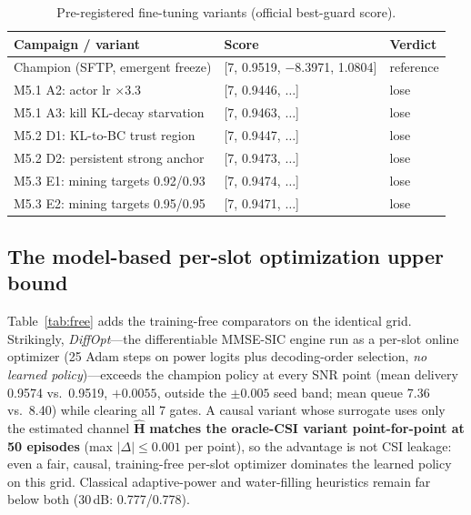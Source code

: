 \documentclass[journal]{IEEEtran}
\newcommand{\vect}[1]{\mathbf{#1}}
\begin{document}
\begin{table}[t]
\centering
\small
\caption{Pre-registered fine-tuning variants (official best-guard score).}
\label{tab:campaign}
\begin{tabular}{l|l|l}
\toprule
Campaign / variant & Score & Verdict \\
\midrule
Champion (SFTP, emergent freeze) & [7, 0.9519, $-$8.3971, 1.0804] & reference \\
M5.1 A2: actor lr $\times$3.3 & [7, 0.9446, $\dots$] & lose \\
M5.1 A3: kill KL-decay starvation & [7, 0.9463, $\dots$] & lose \\
M5.2 D1: KL-to-BC trust region & [7, 0.9447, $\dots$] & lose \\
M5.2 D2: persistent strong anchor & [7, 0.9473, $\dots$] & lose \\
M5.3 E1: mining targets 0.92/0.93 & [7, 0.9474, $\dots$] & lose \\
M5.3 E2: mining targets 0.95/0.95 & [7, 0.9471, $\dots$] & lose \\
\bottomrule
\end{tabular}
\end{table}

\subsection{The model-based per-slot optimization upper bound}
Table~\ref{tab:free} adds the training-free comparators on the identical grid.
Strikingly, \emph{DiffOpt}---the differentiable MMSE-SIC engine run as a per-slot
online optimizer (25 Adam steps on power logits plus decoding-order selection,
\emph{no learned policy})---exceeds the champion policy at every SNR point (mean
delivery 0.9574 vs.\ 0.9519, $+0.0055$, outside the $\pm0.005$ seed band; mean queue
7.36 vs.\ 8.40) while clearing all 7 gates. A causal variant whose surrogate uses
only the estimated channel $\hat{\vect{H}}$ \textbf{matches the oracle-CSI variant
point-for-point at 50 episodes} (max $|\Delta| \le 0.001$ per point), so the
advantage is not CSI leakage: even a fair, causal, training-free per-slot
optimizer dominates the learned policy on this grid. Classical adaptive-power and
water-filling heuristics remain far below both (30\,dB: 0.777/0.778).
\end{document}
